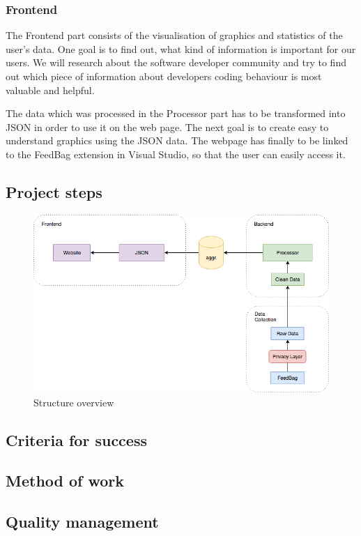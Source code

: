 \documentclass{seal_article}
\begin{document}
\subsubsection{Frontend}
The Frontend part consists of the visualisation of graphics and statistics of the user’s data. One goal is to find out, what kind of information is important for our users. We will research about the software developer community and try to find out which piece of information about developers coding behaviour is most valuable and helpful.

The data which was processed in the Processor part has to be transformed into JSON in order to use it on the web page. The next goal is to create easy to understand graphics using the JSON data. The webpage has finally to be linked to the FeedBag extension in Visual Studio, so that the user can easily access it.

\subsection{Project steps}
\begin{figure}
  \includegraphics[width=\linewidth]{images/master_project_structure_v2.png}
  \caption{Structure overview}
  \label{fig:struct}
\end{figure}

\subsection{Criteria for success}
\subsection{Method of work}
\subsection{Quality management}
\end{document}
